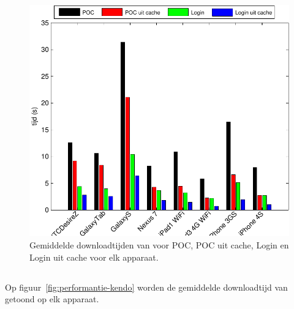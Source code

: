 
\begin{figure}[H]
  \centering
  \includegraphics[width=\textwidth]{figuren/performance-st.pdf}
  \caption{Gemiddelde downloadtijden van \st{} voor POC,  POC uit cache,  Login en Login uit cache voor elk apparaat.}
  \label{fig:performantie-st}
\end{figure}

\subsection{\kendo}
Op figuur~\ref{fig:performantie-kendo} worden de gemiddelde downloadtijd van \kendo{} getoond op elk apparaat.


